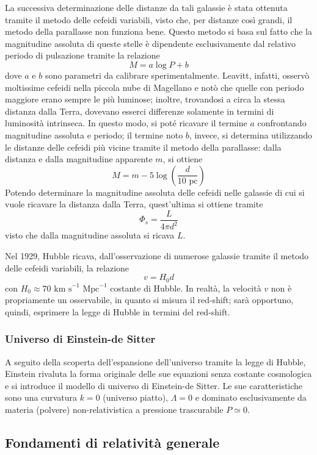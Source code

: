 \documentclass[11pt, a4paper]{scrartcl}
\theoremstyle{style}
\theoremstyle{style1}
\numberwithin{equation}{subsection}
\begin{document}
La successiva determinazione delle distanze da tali galassie \`e stata ottenuta tramite il metodo delle cefeidi variabili, visto che, per distanze cos\`i grandi, il metodo della parallasse non funziona bene.
Questo metodo si basa sul fatto che la magnitudine assoluta di queste stelle \`e dipendente esclusivamente dal relativo periodo di pulsazione tramite la relazione
\[
M = a \log P + b
\] 
dove $a$ e $b$ sono parametri da calibrare sperimentalmente.
Leavitt, infatti, osserv\`o moltissime cefeidi nella piccola nube di Magellano e not\`o che quelle con periodo maggiore erano sempre le pi\`u luminose; inoltre, trovandosi a circa la stessa distanza dalla Terra, dovevano esserci differenze solamente in termini di luminosit\`a intrinseca. 
In questo modo, si pot\'e ricavare il termine $a$ confrontando magnitudine assoluta e periodo; il termine noto $b$, invece, si determina utilizzando le distanze delle cefeidi pi\`u vicine tramite il metodo della parallasse: dalla distanza e dalla magnitudine apparente $m$, si ottiene 
\[
M = m - 5 \log \left(\frac{d}{10 \text{ pc}}\right) 
\] 
Potendo determinare la magnitudine assoluta delle cefeidi nelle galassie di cui si vuole ricavare la distanza dalla Terra, quest'ultima si ottiene tramite
\[
\Phi _s = \frac{L}{4 \pi d^2}
\] 
visto che dalla magnitudine assoluta si ricava $L$.

Nel 1929, Hubble ricava, dall'osservazione di numerose galassie tramite il metodo delle cefeidi variabili, la relazione
\begin{equation}
	v = H_0d
\end{equation}
con $H_0 \approx 70 \text{ km s}^{-1} \text{ Mpc}^{-1}$ costante di Hubble.
In realt\`a, la velocit\`a $v$ non \`e propriamente un osservabile, in quanto si misura il red-shift; sar\`a opportuno, quindi, esprimere la legge di Hubble in termini del red-shift.

\subsubsection{Universo di Einstein-de Sitter}

A seguito della scoperta dell'espansione dell'universo tramite la legge di Hubble, Einstein rivaluta la forma originale delle sue equazioni senza costante cosmologica e si introduce il modello di universo di Einstein-de Sitter.
Le sue caratteristiche sono una curvatura $k=0$ (universo piatto), $\Lambda =0$ e dominato esclusivamente da materia (polvere) non-relativistica a pressione trascurabile $P\simeq 0$.
\subsection{Fondamenti di relativit\`a generale}
\end{document}
